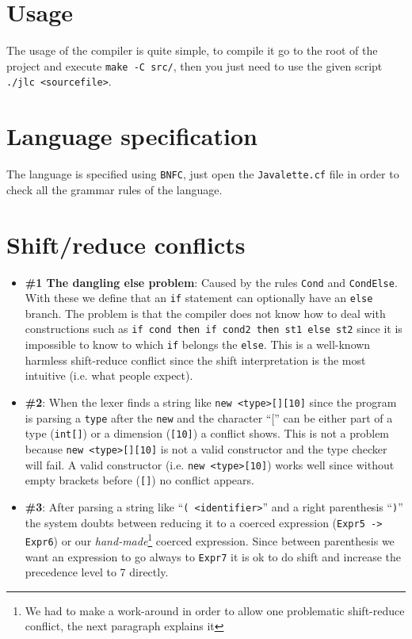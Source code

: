 \documentclass{article}
\begin{document}
\section{Usage}
The usage of the compiler is quite simple, to compile it go to the root of the project and execute \texttt{make -C src/}, then you just need to use the given script \texttt{./jlc <sourcefile>}.\\

\section{Language specification}
The language is specified using \texttt{BNFC}, just open the \texttt{Javalette.cf} file in order to check all the grammar rules of the language.

\section{Shift/reduce conflicts}

\begin{itemize}
  \item {\bf \#1 The dangling else problem}: Caused by the rules \texttt{Cond} and \texttt{CondElse}. With these we define that an \texttt{if} statement can optionally have an \texttt{else} branch. The problem is that the compiler does not know how to deal with constructions such as \texttt{if cond then if cond2 then st1 else st2} since it is impossible to know to which \texttt{if} belongs the \texttt{else}. This is a well-known harmless shift-reduce conflict since the shift interpretation is the most intuitive (i.e. what people expect).
  \item {\bf \#2}: When the lexer finds a string like \texttt{new <type>[][10]} since the 
  program is parsing a \texttt{type} after the \texttt{new} and the character ``['' can be either 
  part of a type (\texttt{int[]}) or a dimension (\texttt{[10]}) a conflict shows. This is not a problem because 
  \texttt{new <type>[][10]} is not a valid constructor and the type checker will fail. A valid constructor 
  (i.e. \texttt{new <type>[10]}) works well since without empty brackets before (\texttt{[]}) no conflict appears.
  \item {\bf \#3}: After parsing a string like ``\texttt{( <identifier>}'' and a right parenthesis ``\texttt{)}'' the system 
  doubts between reducing it to a coerced expression (\texttt{Expr5 -> Expr6}) or our \textit{hand-made}\footnote{We had to make a work-around in order to allow one problematic shift-reduce conflict, the next paragraph explains it} coerced expression. Since between parenthesis we want an expression to go always to \texttt{Expr7} it is ok to do shift and increase the precedence level to 7 directly.
\end{itemize}
\end{document}

